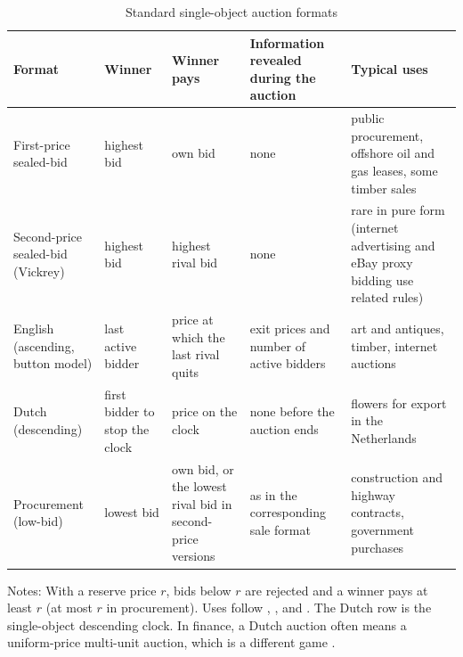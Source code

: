 \begin{table}[htbp]
\centering
\caption{Standard single-object auction formats}\label{tab:14-formats}
\small
\begin{tabularx}{\textwidth}{@{}>{\raggedright\arraybackslash}p{2.35cm}>{\raggedright\arraybackslash}p{2.0cm}>{\raggedright\arraybackslash}p{2.45cm}>{\raggedright\arraybackslash}X>{\raggedright\arraybackslash}X@{}}
\toprule
Format & Winner & Winner pays & Information revealed during the auction & Typical uses \\
\midrule
First-price sealed-bid & highest bid & own bid & none & public procurement, offshore oil and gas
leases, some timber sales \\
\addlinespace
Second-price sealed-bid (Vickrey) & highest bid & highest rival bid & none & rare in pure form (internet
advertising and eBay proxy bidding use related rules) \\
\addlinespace
English (ascending, button model) & last active bidder & price at which the last rival quits & exit prices
and number of active bidders & art and antiques, timber, internet auctions \\
\addlinespace
Dutch (descending) & first bidder to stop the clock & price on the clock & none before the auction ends &
flowers for export in the Netherlands \\
\addlinespace
Procurement (low-bid) & lowest bid & own bid, or the lowest rival bid in second-price versions & as in the
corresponding sale format & construction and highway contracts, government purchases \\
\bottomrule
\end{tabularx}

\smallskip
\begin{minipage}{\textwidth}
\footnotesize Notes: With a reserve price $r$, bids below $r$ are rejected and a winner pays at least $r$
(at most $r$ in procurement). Uses follow \citet[pp.~1089--1091]{MilgromWeber1982},
\citet[Section~1 and footnote~2]{AtheyHaile2007}, \citet[p.~871]{HendricksPorter1988} and
\citet[pp.~86, 101 and 124]{HortacsuPerrigne2021}. The Dutch row is the single-object descending clock.
In finance, a Dutch auction often means a uniform-price multi-unit auction, which is a different game
\citep[footnote~110]{AtheyHaile2007}.
\end{minipage}
\end{table}


